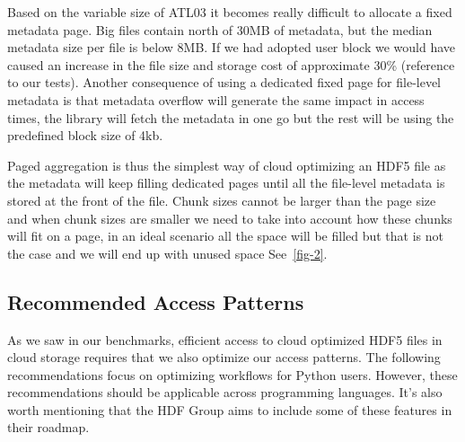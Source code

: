 \documentclass[
]{agujournal2019}
\begin{document}
Based on the variable size of ATL03 it becomes really difficult to
allocate a fixed metadata page. Big files contain north of 30MB of
metadata, but the median metadata size per file is below 8MB. If we had
adopted user block we would have caused an increase in the file size and
storage cost of approximate 30\% (reference to our tests). Another
consequence of using a dedicated fixed page for file-level metadata is
that metadata overflow will generate the same impact in access times,
the library will fetch the metadata in one go but the rest will be using
the predefined block size of 4kb.

Paged aggregation is thus the simplest way of cloud optimizing an HDF5
file as the metadata will keep filling dedicated pages until all the
file-level metadata is stored at the front of the file. Chunk sizes
cannot be larger than the page size and when chunk sizes are smaller we
need to take into account how these chunks will fit on a page, in an
ideal scenario all the space will be filled but that is not the case and
we will end up with unused space See~\ref{fig-2}.

\subsection{Recommended Access
Patterns}\label{recommended-access-patterns}

As we saw in our benchmarks, efficient access to cloud optimized HDF5
files in cloud storage requires that we also optimize our access
patterns. The following recommendations focus on optimizing workflows
for Python users. However, these recommendations should be applicable
across programming languages. It's also worth mentioning that the HDF
Group aims to include some of these features in their roadmap.
\end{document}
